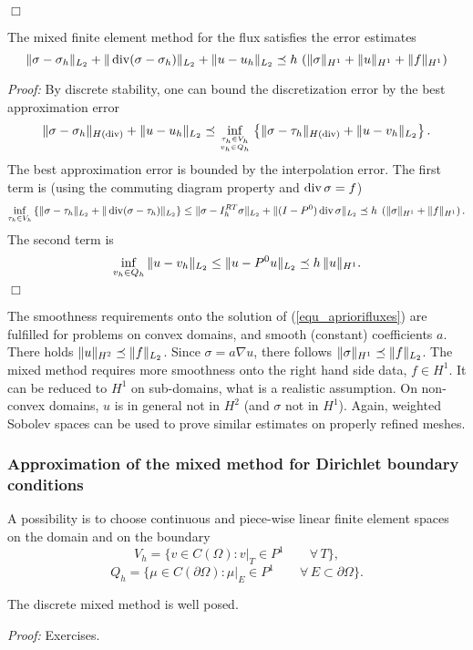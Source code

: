 \hfill $\Box$

\begin{theorem} The mixed finite element method for 
the flux satisfies the error estimates
\begin{equation}
\label{equ_apriorifluxes}
\| \sigma - \sigma_h \|_{L_2} + \| \operatorname{div} (\sigma - \sigma_h) \|_{L_2} +
\| u - u_h \|_{L_2} \preceq h \, \left( \| \sigma \|_{H^1} + \| u \|_{H^1} + \| f \|_{H^1} \right)
\end{equation}
\end{theorem}
{\em Proof:} By discrete stability, one can bound the discretization error
by the best approximation error
$$
\| \sigma - \sigma_h \|_{H(\operatorname{div})} + \| u - u_h \|_{L_2} \preceq
\inf_{\tau_h \in V_h \atop v_h \in Q_h } \left\{ \| \sigma - \tau_h \|_{H(\operatorname{div})} + \| u - v_h \|_{L_2} \right\}.
$$
The best approximation error is bounded by the interpolation error. The first
term is (using the commuting diagram property and  $\operatorname{div} \sigma = f$)
$$
\inf_{\tau_h \in V_h } \left\{ \| \sigma - \tau_h \|_{L_2} + \| \operatorname{div}( \sigma - \tau_h) \|_{L_2} \right\}
\leq \| \sigma - I_h^{RT} \sigma \|_{L_2} + \| (I-P^0) \operatorname{div} \sigma \|_{L_2}
        \preceq h \; \left( \| \sigma \|_{H^1} + \| f \|_{H^1} \right).
$$
The second term is
$$
\inf_{v_h \in Q_h} \| u - v_h \|_{L_2} \leq \| u - P^0 u \|_{L_2} \preceq h \, \| u \|_{H^1}.
$$
\hfill $\Box$

\bigskip

The smoothness requirements onto the solution of (\ref{equ_apriorifluxes})
are fulfilled for problems on convex domains, and smooth (constant) 
coefficients $a$. 
There holds $\|u \|_{H^2} \preceq \| f \|_{L_2}$. Since $\sigma = a \nabla u$,
there follows $\| \sigma \|_{H^1} \preceq \| f \|_{L_2}$. The mixed method
requires more smoothness onto the right hand side data, $f \in H^1$. 
It can be reduced to $H^1$ on sub-domains, what is a realistic assumption.
On non-convex domains, $u$ is in general not in $H^2$ (and $\sigma$ not in $H^1$). Again, weighted Sobolev spaces can be used to prove similar estimates
on properly refined meshes.

\subsubsection{Approximation of the mixed method for Dirichlet boundary conditions}
A possibility is to choose continuous and piece-wise linear finite element
spaces on the domain and on the boundary
$$
V_h = \{ v \in C(\Omega) : v|_T \in P^1 \qquad \forall \, T\},
$$
$$
Q_h = \{ \mu \in C(\partial \Omega) : \mu|_E \in P^1 \qquad \forall \, E \subset \partial \Omega\}.
$$
\begin{theorem} The discrete mixed method is well posed.
\end{theorem}
{\em Proof: } Exercises.




